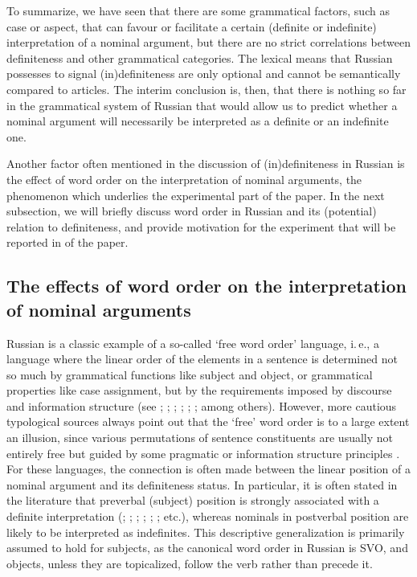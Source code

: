 \documentclass[output=paper]{langsci/langscibook}
\begin{document}
{
To summarize, we have seen that there are some grammatical factors, such as case or aspect, that can favour or facilitate a certain (definite or indefinite) interpretation of a nominal argument, but there are no strict correlations between definiteness and other grammatical categories. The lexical means that Russian possesses to signal (in)definiteness are only optional and cannot be semantically compared to articles. The interim conclusion is, then, that there is nothing so far in the grammatical system of Russian that would allow us to predict whether a nominal argument will necessarily be interpreted as a definite or an indefinite one. 
}

Another factor often mentioned in the discussion of (in)definiteness in Russian is the effect of word order on the interpretation of nominal arguments, the phenomenon which underlies the experimental part of the paper. In the next subsection, we will briefly discuss word order in Russian and its (potential) relation to definiteness, and provide motivation for the experiment that will be reported in  of the paper.

\subsection{The effects of word order on the interpretation of nominal arguments}\label{2sec:22}

Russian is a classic example of a so-called `free word order' language, i.\,e., a language where the linear order of the elements in a sentence is determined not so much by grammatical functions like subject and object, or grammatical properties like case assignment, but by the requirements imposed by discourse and information structure (see \citealt{mathesius:64}; \citealt{sgall:72}; \citealt{hajicova:74}; \citealt{isacenko:76}; \citealt{yokoyama:86}; \citealt{comrie:89}; among others). However, more cautious typological sources always point out that the `free' word order is to a large extent an illusion, since various permutations of sentence constituents are usually not entirely free but guided by some pragmatic or information structure principles \citep[see, for instance,][]{dryer:13}. For these languages, the connection is often made between the linear position of a nominal argument and its definiteness status. In particular, it is often stated in the literature that preverbal (subject) position is strongly associated with a definite interpretation (\citealt{pospelov:70}; \citealt{fursenko:70}; \citealt{kramsky:72}; \citealt{chvany:73}; \citealt{szwedek:74}; \citealt{topolinjska:09}; etc.), whereas nominals in postverbal position are likely to be interpreted as indefinites. This descriptive generalization is primarily assumed to hold for subjects, as the canonical word order in Russian is SVO, and objects, unless they are topicalized, follow the verb rather than precede it. 
\end{document}
